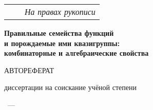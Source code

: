 \thispagestyle{empty}

\thispagestyle{empty}
\begin{center}
\large{\thesisOrganization}
\end{center}

\vspace{0pt plus1fill}
\noindent%
\begin{tabularx}{\textwidth}{@{}lXr@{}}%
    & & \large{\textit{На правах рукописи}}\\
\end{tabularx}

\vspace{0pt plus2fill} %
\begin{center}
\textbf {\Large \thesisAuthor}
\end{center}

\vspace{0pt plus1fill} %
\begin{center}
    \huge{\textbf{Правильные семейства функций \\ и порождаемые ими квазигруппы: \\ комбинаторные и алгебраические свойства}}

\vspace{0pt plus3fill} %
{\Large \textbf{\thesisSpecialtyNumber \; \thesisSpecialtyTitle}}

\vspace{0pt plus1.5fill} %
\Large{АВТОРЕФЕРАТ}\par
\large{диссертации на соискание учёной степени\par \thesisDegree}
\end{center}

\vspace{0pt plus4fill} %
{\centering\thesisCity~--- \thesisYear\par}

